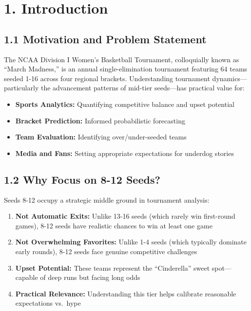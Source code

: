 \documentclass[
]{article}
\providecommand{\tightlist}{%
  \setlength{\itemsep}{0pt}\setlength{\parskip}{0pt}}
\begin{document}
\section{1. Introduction}\label{introduction}

\subsection{1.1 Motivation and Problem
Statement}\label{motivation-and-problem-statement}

The NCAA Division I Women's Basketball Tournament, colloquially known as
``March Madness,'' is an annual single-elimination tournament featuring
64 teams seeded 1-16 across four regional brackets. Understanding
tournament dynamics---particularly the advancement patterns of mid-tier
seeds---has practical value for:

\begin{itemize}
\tightlist
\item
  \textbf{Sports Analytics:} Quantifying competitive balance and upset
  potential
\item
  \textbf{Bracket Prediction:} Informed probabilistic forecasting
\item
  \textbf{Team Evaluation:} Identifying over/under-seeded teams
\item
  \textbf{Media and Fans:} Setting appropriate expectations for underdog
  stories
\end{itemize}

\subsection{1.2 Why Focus on 8-12 Seeds?}\label{why-focus-on-8-12-seeds}

Seeds 8-12 occupy a strategic middle ground in tournament analysis:

\begin{enumerate}
\def\labelenumi{\arabic{enumi}.}
\tightlist
\item
  \textbf{Not Automatic Exits:} Unlike 13-16 seeds (which rarely win
  first-round games), 8-12 seeds have realistic chances to win at least
  one game
\item
  \textbf{Not Overwhelming Favorites:} Unlike 1-4 seeds (which typically
  dominate early rounds), 8-12 seeds face genuine competitive challenges
\item
  \textbf{Upset Potential:} These teams represent the ``Cinderella''
  sweet spot---capable of deep runs but facing long odds
\item
  \textbf{Practical Relevance:} Understanding this tier helps calibrate
  reasonable expectations vs.~hype
\end{enumerate}
\end{document}
